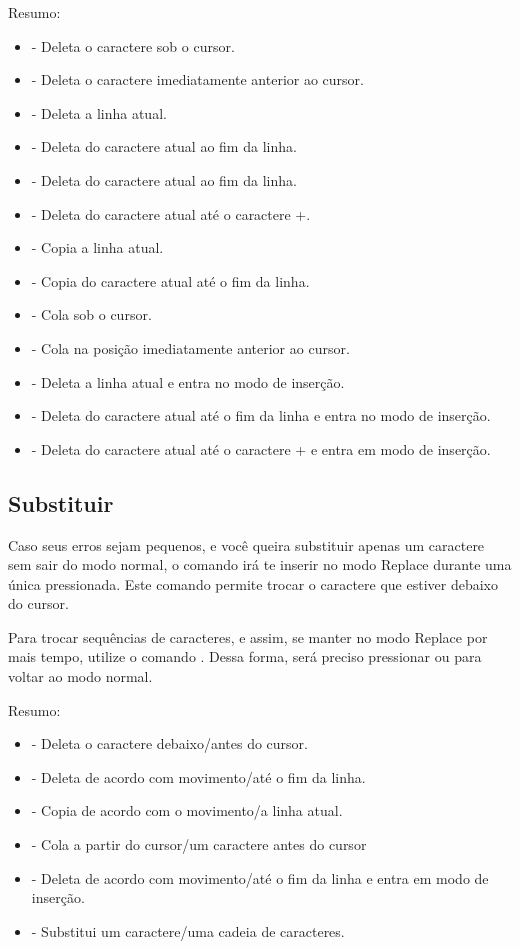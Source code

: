 Resumo:
\begin{itemize}
    \item {} - Deleta o caractere sob o cursor.
    \item {} - Deleta o caractere imediatamente anterior ao cursor.
    \item {} - Deleta a linha atual.
    \item {} - Deleta do caractere atual ao fim da linha.
    \item {} - Deleta do caractere atual ao fim da linha.
    \item {} - Deleta do caractere atual até o caractere +.
    \item {} - Copia a linha atual.
    \item {} - Copia do caractere atual até o fim da linha.
    \item {} - Cola sob o cursor.
    \item {} - Cola na posição imediatamente anterior ao cursor.
    \item {} - Deleta a linha atual e entra no modo de inserção.
    \item {} - Deleta do caractere atual até o fim da linha e entra no modo de inserção.
    \item {} - Deleta do caractere atual até o caractere + e entra em modo de inserção.
\end{itemize}


\subsection{Substituir}
Caso seus erros sejam pequenos, e você queira substituir apenas um caractere sem sair do modo normal,
o comando  irá te inserir no modo Replace durante uma única pressionada.
Este comando permite trocar o caractere que estiver debaixo do cursor.

Para trocar sequências de caracteres, e assim, se manter no modo Replace por mais tempo, utilize o comando .
Dessa forma, será preciso pressionar  ou  para voltar ao modo normal.

Resumo:
\begin{itemize}
    \item {} - Deleta o caractere debaixo/antes do cursor.
    \item {} - Deleta de acordo com movimento/até o fim da linha.
    \item {} - Copia de acordo com o movimento/a linha atual.
    \item {} - Cola a partir do cursor/um caractere antes do cursor
    \item {} - Deleta de acordo com movimento/até o fim da linha e entra em modo de inserção.
    \item {} - Substitui um caractere/uma cadeia de caracteres.
\end{itemize}

